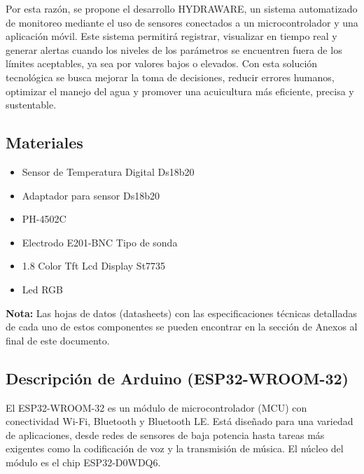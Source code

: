 \documentclass[a4paper,12pt]{article}
\begin{document}
	Por esta razón, se propone el desarrollo HYDRAWARE, un sistema automatizado de monitoreo mediante el uso de sensores conectados a un microcontrolador y una aplicación móvil. Este sistema permitirá registrar, visualizar en tiempo real y generar alertas cuando los niveles de los parámetros se encuentren fuera de los límites aceptables, ya sea por valores bajos o elevados. Con esta solución tecnológica se busca mejorar la toma de decisiones, reducir errores humanos, optimizar el manejo del agua y promover una acuicultura más eficiente, precisa y sustentable.
	
	\subsection{Materiales}
	\begin{itemize}
		\item Sensor de Temperatura Digital Ds18b20
		\item Adaptador para sensor Ds18b20
		\item PH-4502C
		\item Electrodo E201-BNC Tipo de sonda
		\item 1.8 Color Tft Lcd Display St7735
		\item Led RGB
	\end{itemize}
	\textbf{Nota:} Las hojas de datos (datasheets) con las especificaciones técnicas detalladas de cada uno de estos componentes se pueden encontrar en la sección de Anexos al final de este documento.

	
	\subsection{Descripción de Arduino (ESP32-WROOM-32)}
	El ESP32-WROOM-32 es un módulo de microcontrolador (MCU) con conectividad Wi-Fi, Bluetooth y Bluetooth LE. Está diseñado para una variedad de aplicaciones, desde redes de sensores de baja potencia hasta tareas más exigentes como la codificación de voz y la transmisión de música. El núcleo del módulo es el chip ESP32-D0WDQ6.
	
\end{document}
